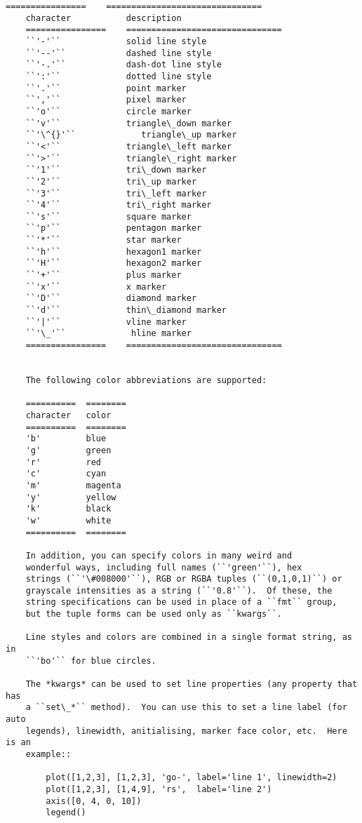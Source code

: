 \documentclass[11pt]{article}
\begin{document}
\begin{Verbatim}[commandchars=\\\{\}]
    ================    ===============================
    character           description
    ================    ===============================
    ``'-'``             solid line style
    ``'--'``            dashed line style
    ``'-.'``            dash-dot line style
    ``':'``             dotted line style
    ``'.'``             point marker
    ``','``             pixel marker
    ``'o'``             circle marker
    ``'v'``             triangle\_down marker
    ``'\^{}'``             triangle\_up marker
    ``'<'``             triangle\_left marker
    ``'>'``             triangle\_right marker
    ``'1'``             tri\_down marker
    ``'2'``             tri\_up marker
    ``'3'``             tri\_left marker
    ``'4'``             tri\_right marker
    ``'s'``             square marker
    ``'p'``             pentagon marker
    ``'*'``             star marker
    ``'h'``             hexagon1 marker
    ``'H'``             hexagon2 marker
    ``'+'``             plus marker
    ``'x'``             x marker
    ``'D'``             diamond marker
    ``'d'``             thin\_diamond marker
    ``'|'``             vline marker
    ``'\_'``             hline marker
    ================    ===============================
    
    
    The following color abbreviations are supported:
    
    ==========  ========
    character   color
    ==========  ========
    'b'         blue
    'g'         green
    'r'         red
    'c'         cyan
    'm'         magenta
    'y'         yellow
    'k'         black
    'w'         white
    ==========  ========
    
    In addition, you can specify colors in many weird and
    wonderful ways, including full names (``'green'``), hex
    strings (``'\#008000'``), RGB or RGBA tuples (``(0,1,0,1)``) or
    grayscale intensities as a string (``'0.8'``).  Of these, the
    string specifications can be used in place of a ``fmt`` group,
    but the tuple forms can be used only as ``kwargs``.
    
    Line styles and colors are combined in a single format string, as in
    ``'bo'`` for blue circles.
    
    The *kwargs* can be used to set line properties (any property that has
    a ``set\_*`` method).  You can use this to set a line label (for auto
    legends), linewidth, anitialising, marker face color, etc.  Here is an
    example::
    
        plot([1,2,3], [1,2,3], 'go-', label='line 1', linewidth=2)
        plot([1,2,3], [1,4,9], 'rs',  label='line 2')
        axis([0, 4, 0, 10])
        legend()
    

\end{Verbatim}
\end{document}
